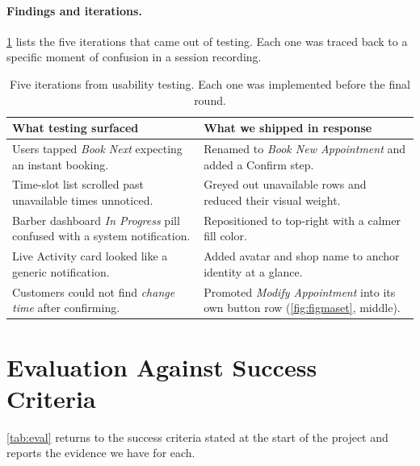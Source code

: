 \documentclass[12pt,a4paper]{article}
\begin{document}
\paragraph{Findings and iterations.}
\cref{tab:iterations} lists the five iterations that came out of
testing. Each one was traced back to a specific moment of confusion
in a session recording.

\begin{table}[H]
\centering\small
\begin{tabular}{@{}p{7.0cm}p{8.5cm}@{}}
\toprule
\textbf{What testing surfaced} & \textbf{What we shipped in response}\\
\midrule
Users tapped \emph{Book Next} expecting an instant booking. &
  Renamed to \emph{Book New Appointment} and added a Confirm step.\\
\addlinespace
Time-slot list scrolled past unavailable times unnoticed. &
  Greyed out unavailable rows and reduced their visual weight.\\
\addlinespace
Barber dashboard \emph{In Progress} pill confused with a system notification. &
  Repositioned to top-right with a calmer fill color.\\
\addlinespace
Live Activity card looked like a generic notification. &
  Added avatar and shop name to anchor identity at a glance.\\
\addlinespace
Customers could not find \emph{change time} after confirming. &
  Promoted \emph{Modify Appointment} into its own button row
  (\cref{fig:figmaset}, middle).\\
\bottomrule
\end{tabular}
\caption{Five iterations from usability testing. Each one was
implemented before the final round.}
\label{tab:iterations}
\end{table}

\section{Evaluation Against Success Criteria}
\label{sec:eval}

\cref{tab:eval} returns to the success criteria stated at the start
of the project and reports the evidence we have for each.
\end{document}
